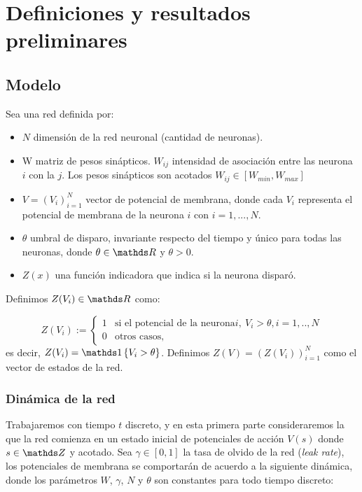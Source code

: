 \section{Definiciones y resultados preliminares}

\subsection{Modelo}

Sea una red definida por:

\begin{itemize}
    \item $N$ dimensión de la red neuronal (cantidad de neuronas).
    \item W matriz de pesos sinápticos. $W_{ij}$ intensidad de asociación entre las neurona $i$ con la $j$. Los pesos sinápticos son acotados $W_{ij} \in [W_{min},W_{max}]$
    \item $V=(V_i)_{i=1}^N$ vector de potencial de membrana, donde cada $V_i$ representa el potencial de membrana de la neurona $i$ con $i={1,...,N}$.
    \item $\theta$ umbral de disparo, invariante respecto del tiempo y único para todas las neuronas, donde $\theta \in \reals$ y $\theta >0$.
    \item $Z(x)$ una función indicadora que indica si la neurona disparó.
\end{itemize}

Definimos $Z(V_i) \in \reals$ como:

\begin{equation*}
    Z(V_i) :=  \left\{ \begin{array}{ll}
            1   & \text{si el potencial de la neurona} i, \ V_i > \theta, i={1,..,N} \\ 
            0  & \text{otros casos},
            \end{array}\right.
    \label{eqn:indicadoraV}
\end{equation*}
es decir, $Z(V_i)=\indi{V_i>\theta}$. Definimos $Z(V)= (Z(V_i))^N_{i=1}$ como el vector de estados de la red.

\subsubsection{Dinámica de la red}

Trabajaremos con tiempo $t$ discreto, y en esta primera parte consideraremos la que la red comienza en un estado inicial de potenciales de acción $V(s)$ donde $s \in \enteros$ y acotado. 
Sea $\gamma \in [0,1]$ la tasa de olvido de la red (\emph{leak rate}), los potenciales de membrana se comportarán de acuerdo a la siguiente dinámica, donde los parámetros $W$, $\gamma$, $N$ y $\theta$ son constantes para todo tiempo discreto:


